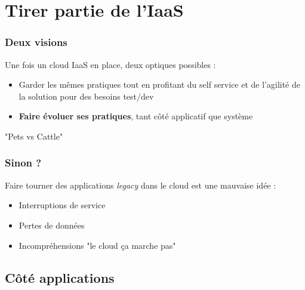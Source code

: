   \section{Tirer partie de l'IaaS}

  \begin{frame}
    \frametitle{Deux visions}
    Une fois un cloud IaaS en place, deux optiques possibles :
    \begin{itemize}
      \item Garder les mêmes pratiques tout en profitant du self service et de l'agilité de la solution pour des besoins test/dev
      \item \textbf<2->{Faire évoluer ses pratiques}, tant côté applicatif que système
    \end{itemize}\pause
    "Pets vs Cattle"
  \end{frame}

  \begin{frame}
    \frametitle{Sinon ?}
    Faire tourner des applications \textit{legacy} dans le cloud est une mauvaise idée :
    \begin{itemize}
      \item Interruptions de service
      \item Pertes de données
      \item Incompréhensions "le cloud ça marche pas"
    \end{itemize}
  \end{frame}

  \subsection{Côté applications}

